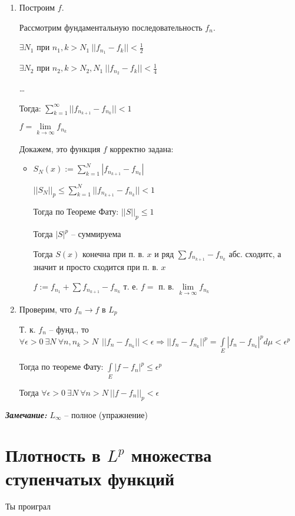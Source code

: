 \documentclass[paper=a4, fontsize=14pt]{report}
\begin{document}
\begin{enumerate}
	\item Построим $ f $.

	Рассмотрим фундаментальную последовательность $ f_n $.

	$ \exists N_1 $ при $ n_1, k > N_1 ~ ||f_{n_1} - f_k|| < \frac{1}{2}$

	$ \exists N_2 $ при $ n_2, k > N_2, N_1 ~ ||f_{n_2} - f_k|| < \frac{1}{4}$

	\dots

	Тогда: $ \sum_{k = 1}^{\infty} || f_{n_{k+1}} - f_{n_k} || < 1$

	$ f = \lim\limits_{k \rightarrow \infty} f_{n_k}$

	Докажем, это функция $ f $ корректно задана:
	\begin{itemize}
		\item
		$ S_N (x) := \sum_{k = 1}^{N}|f_{n_{k+1}} - f_{n_k}|$

		$ ||S_N||_p \leq \sum_{k = 1}^{N} || f_{n_{k+1}} - f_{n_k} || < 1$

		Тогда по Теореме Фату: $ ||S||_p \leq 1 $

		Тогда $ |S|^p $ -- суммируема

		Тогда $ S(x) $ конечна при п. в. $ x $  и ряд $ \sum f_{n_{k + 1}} - f_{n_k} $ абс. сходитс, а значит и просто сходится при п. в. $ x $

		$ f:= f_{n_1} +  \sum f_{n_{k + 1}} - f_{n_k} $ т. е. $ f = $ п. в. $ \lim\limits_{k \rightarrow \infty} f_{n_k} $
	\end{itemize}

	\item Проверим, что $ f_n \rightarrow f $ в $ L_p $

	Т. к. $ f_n $ -- фунд., то $ \forall \epsilon > 0 ~ \exists N ~ \forall n, n_k > N ~ ~ ||f_n - f_{n_k} || < \epsilon \Rightarrow
	|| f_n  - f_{n_k} ||^p  = \int\limits_{E} |f_n  - f_{n_k}|^p d\mu < \epsilon^p $

	Тогда по теореме Фату: $ \int\limits_{E} |f - f_n|^p \leq \epsilon^p$

	Тогда $ \forall \epsilon > 0 ~ \exists N ~ \forall n > N ~ || f - f_n ||_p < \epsilon $


\end{enumerate}
\textbf{\emph{Замечание:}} $ L_{\infty} $ -- полное (упражнение)

    \section{Плотность в $L^p$ множества ступенчатых функций}
    Ты проиграл
\end{document}
